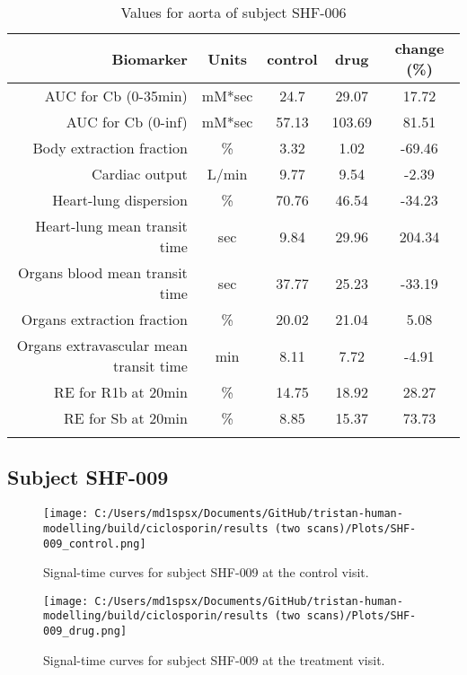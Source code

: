 \documentclass{epflreport}%
\begin{document}
\begin{longtable}{rcccc}%
\hline%
Biomarker&Units&control&drug&change (\%)\\%
\hline%
AUC for Cb (0{-}35min)&mM*sec&24.7&29.07&17.72\\%
AUC for Cb (0{-}inf)&mM*sec&57.13&103.69&81.51\\%
Body extraction fraction&\%&3.32&1.02&{-}69.46\\%
Cardiac output&L/min&9.77&9.54&{-}2.39\\%
Heart{-}lung dispersion&\%&70.76&46.54&{-}34.23\\%
Heart{-}lung mean transit time&sec&9.84&29.96&204.34\\%
Organs blood mean transit time&sec&37.77&25.23&{-}33.19\\%
Organs extraction fraction&\%&20.02&21.04&5.08\\%
Organs extravascular mean transit time&min&8.11&7.72&{-}4.91\\%
RE for R1b at 20min&\%&14.75&18.92&28.27\\%
RE for Sb at 20min&\%&8.85&15.37&73.73\\%
\hline%
\caption{Values for aorta of subject SHF-006} \\%
\end{longtable}%
\clearpage%
\subsection{Subject SHF{-}009}%
\label{subsec:SubjectSHF{-}009}%

%


\begin{figure}[h!]%
\centering%
\texttt{[image: C:/Users/md1spsx/Documents/GitHub/tristan-human-modelling/build/ciclosporin/results (two scans)/Plots/SHF-009\_control.png]}%
\caption{Signal{-}time curves for subject SHF{-}009 at the control visit.}%
\end{figure}

%


\begin{figure}[h!]%
\centering%
\texttt{[image: C:/Users/md1spsx/Documents/GitHub/tristan-human-modelling/build/ciclosporin/results (two scans)/Plots/SHF-009\_drug.png]}%
\caption{Signal{-}time curves for subject SHF{-}009 at the treatment visit.}%
\end{figure}
\end{document}
